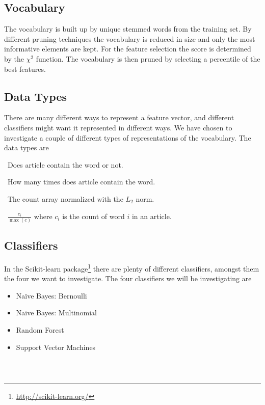 \subsection{Vocabulary}
The vocabulary is built up by unique stemmed words from the training set. By different pruning techniques the vocabulary is reduced in size and only the most informative elements are kept. For the feature selection the score is determined by the $\chi^2$ function. The vocabulary is then pruned by selecting a percentile of the best features.
\subsection{Data Types}
There are many different ways to represent a feature vector, and different classifiers might want it represented in different ways. We have chosen to investigate a couple of different types of representations of the vocabulary. The data types are
\begin{description}[noitemsep,labelindent=0.5cm]
\small
\item[Binary:]\ Does article contain the word or not.
\item[Count:]\ How many times does article contain the word.
\item[$L_2$-normalized:]\ The count array normalized with the $L_2$ norm. 
\item[Mapped value from 0 to 1:]\ $\frac{c_i}{\max(c)}$ where $c_i$ is the count of word $i$ in an article.
\end{description}

\subsection{Classifiers}
In the Scikit-learn package\footnote{\label{ftn:scikit}\url{http://scikit-learn.org/}} there are plenty of different classifiers, amongst them the four we want to investigate. The four classifiers we will be investigating are
\begin{itemize}[noitemsep,nolistsep]
\item Naïve Bayes: Bernoulli
\item Naïve Bayes: Multinomial
\item Random Forest 
\item Support Vector Machines
\end{itemize}

\subsubsection{\bn\ \nb} %
\label{ssub:bernoulli}

